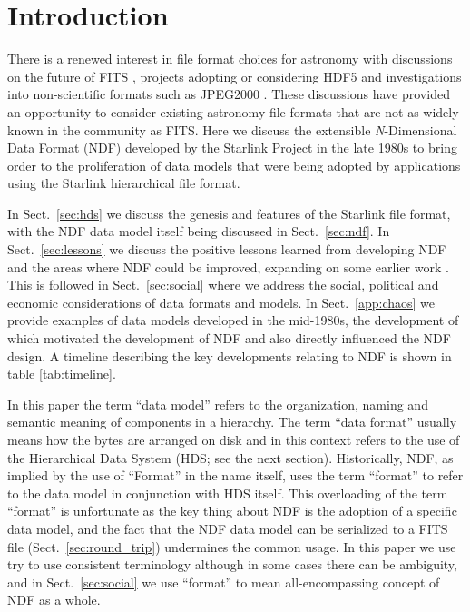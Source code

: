 \documentclass[final,authoryear,5p,times,twocolumn]{elsarticle}
\newcommand*\secref[1]{Sect.~\ref{#1}}
\begin{document}
\section{Introduction}
\label{sec:intro}

There is a renewed interest in file format choices for astronomy
with discussions on the future of FITS
\citep{P90_adassxxiii,2014Thomas}, projects adopting or considering
HDF5 \citep{2012ASPC..461..283A,jenness_spie2014} and investigations into
non-scientific formats such as JPEG2000 \citep{2014Kitaeff}. These
discussions have provided an opportunity to consider existing
astronomy file formats that are not as widely known in the community
as FITS. Here we discuss the extensible \emph{N}-Dimensional
Data Format (NDF) developed by the Starlink Project
\citep{1982MmSAI..53...55T,2000ASSL..250...93W} in the late 1980s
\citep{1988STARB...2...11C,SGP38} to bring order to the proliferation
of data models that were being adopted by applications using the Starlink
hierarchical file format.

In \secref{sec:hds} we discuss the genesis and features of the
Starlink file format, with the NDF data model itself being discussed
in \secref{sec:ndf}.  In \secref{sec:lessons} we discuss the positive
lessons learned from developing NDF and the areas where NDF could be
improved, expanding on some earlier work \citep{P91_adassxxiii}. This
is followed in \secref{sec:social} where we address the social,
political and economic considerations of data formats and models. In
\secref{app:chaos} we provide examples of data models developed in the
mid-1980s, the development of which motivated the development of NDF
and also directly influenced the NDF design. A timeline describing the
key developments relating to NDF is shown in table \ref{tab:timeline}.

In this paper the term ``data model'' refers to the organization,
naming and semantic meaning of components in a hierarchy. The term
``data format'' usually means how the bytes are arranged on disk and
in this context refers to the use of the Hierarchical Data System
(HDS; see the next section). Historically, NDF, as implied by the use
of ``Format'' in the name itself, uses the term ``format'' to refer to
the data model in conjunction with HDS itself.  This overloading of
the term ``format'' is unfortunate as the key thing about NDF is the
adoption of a specific data model, and the fact that the NDF data
model can be serialized to a FITS file (\secref{sec:round_trip})
undermines the common usage.  In this paper we use try to use
consistent terminology although in some cases there can be ambiguity,
and in \secref{sec:social} we use ``format'' to mean all-encompassing
concept of NDF as a whole.
\end{document}
